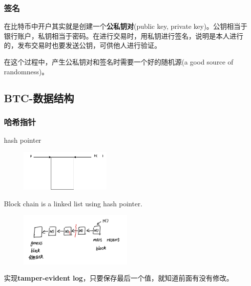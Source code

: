 \documentclass[10pt]{ctexart}
\begin{document}
\subsubsection{签名}
在比特币中开户其实就是创建一个\textbf{公私钥对}(public key, private key)。公钥相当于银行账户，私钥相当于密码。在进行交易时，用私钥进行签名，说明是本人进行的，发布交易时也要发送公钥，可供他人进行验证。

在这个过程中，产生公私钥对和签名时需要一个好的随机源(a good source of randomness)。
\subsection{BTC-数据结构}
\subsubsection{哈希指针}
hash pointer
\begin{figure}[H]
    \centering
    \includegraphics[width=0.4\textwidth]{courses/区块链技术与应用/lecture3/img1.png} 
\end{figure}
Block chain is a linked list using hash pointer.
\begin{figure}[H]
    \centering
    \includegraphics[width=0.5\textwidth]{courses/区块链技术与应用/lecture3/img2.png} 
\end{figure}

实现\textbf{tamper-evident log}，只要保存最后一个值，就知道前面有没有修改。
\end{document}
